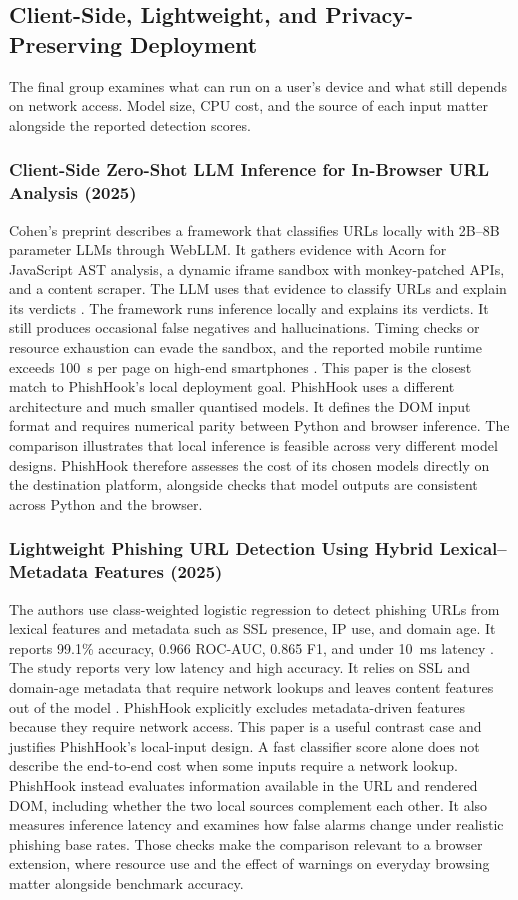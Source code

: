 \documentclass{FastFyp}
\begin{document}
\subsection{Client-Side, Lightweight, and Privacy-Preserving Deployment}
The final group examines what can run on a user's device and what still depends on network access. Model size, CPU cost, and the source of each input matter alongside the reported detection scores.

\subsubsection{Client-Side Zero-Shot LLM Inference for In-Browser URL Analysis (2025)}
Cohen's preprint describes a framework that classifies URLs locally with 2B--8B parameter LLMs through WebLLM. It gathers evidence with Acorn for JavaScript AST analysis, a dynamic iframe sandbox with monkey-patched APIs, and a content scraper. The LLM uses that evidence to classify URLs and explain its verdicts \cite{zeroshotllm2025}. The framework runs inference locally and explains its verdicts. It still produces occasional false negatives and hallucinations. Timing checks or resource exhaustion can evade the sandbox, and the reported mobile runtime exceeds 100~s per page on high-end smartphones \cite{zeroshotllm2025}. This paper is the closest match to PhishHook's local deployment goal. PhishHook uses a different architecture and much smaller quantised models. It defines the DOM input format and requires numerical parity between Python and browser inference. The comparison illustrates that local inference is feasible across very different model designs. PhishHook therefore assesses the cost of its chosen models directly on the destination platform, alongside checks that model outputs are consistent across Python and the browser.

\subsubsection{Lightweight Phishing URL Detection Using Hybrid Lexical--Metadata Features (2025)}
The authors use class-weighted logistic regression to detect phishing URLs from lexical features and metadata such as SSL presence, IP use, and domain age. It reports 99.1\% accuracy, 0.966 ROC-AUC, 0.865 F1, and under 10~ms latency \cite{lexmeta2025}. The study reports very low latency and high accuracy. It relies on SSL and domain-age metadata that require network lookups and leaves content features out of the model \cite{lexmeta2025}. PhishHook explicitly excludes metadata-driven features because they require network access. This paper is a useful contrast case and justifies PhishHook's local-input design. A fast classifier score alone does not describe the end-to-end cost when some inputs require a network lookup. PhishHook instead evaluates information available in the URL and rendered DOM, including whether the two local sources complement each other. It also measures inference latency and examines how false alarms change under realistic phishing base rates. Those checks make the comparison relevant to a browser extension, where resource use and the effect of warnings on everyday browsing matter alongside benchmark accuracy.
\end{document}
